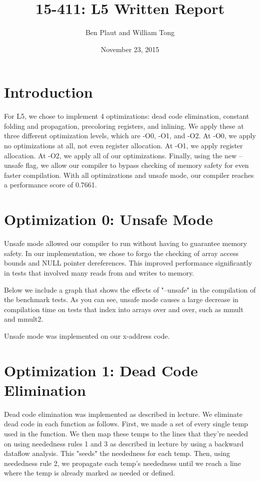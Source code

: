 \documentclass{article}
\title{15-411: L5 Written Report}
\author{Ben Plaut and William Tong}
\date{November 23, 2015}
\begin{document}
\maketitle

\section{Introduction}

For L5, we chose to implement 4 optimizations: dead code elimination, constant folding and propagation, precoloring registers, and inlining. We apply these at three different optimization levels, which are -O0, -O1, and -O2. At -O0, we apply no optimizations at all, not even register allocation. At -O1, we apply register allocation. At -O2, we apply all of our optimizations. Finally, using the new --unsafe flag, we allow our compiler to bypass checking of memory safety for even faster compilation. With all optimizations and unsafe mode, our compiler reaches a performance score of 0.7661.

\section{Optimization 0: Unsafe Mode}

Unsafe mode allowed our compiler to run without having to guarantee memory safety. In our implementation, we chose to forgo the checking of array access bounds and NULL pointer dereferences. This improved performance significantly in tests that involved many reads from and writes to memory. 

Below we include a graph that shows the effects of "--unsafe" in the compilation of the benchmark tests. As you can see, unsafe mode causes a large decrease in compilation time on tests that index into arrays over and over, such as mmult and mmult2. 






Unsafe mode was implemented on our x-address code.

\section{Optimization 1: Dead Code Elimination}

Dead code elimination was implemented as described in lecture. We eliminate dead code in each function as follows. First, we made a set of every single temp used in the function. We then map these temps to the lines that they're needed on using neededness rules 1 and 3 as described in lecture by using a backward dataflow analysis. This "seeds" the neededness for each temp. Then, using neededness rule 2, we propagate each temp's neededness until we reach a line where the temp is already marked as needed or defined. 
\end{document}
